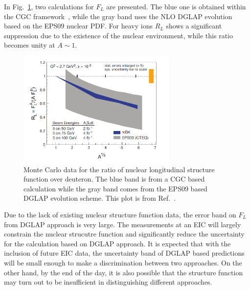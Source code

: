 In Fig.~\ref{fig:F_L}, two calculations for $F_L$ are presented. The blue one is
obtained within the CGC framework~\cite{Albacete:2009fh}, while the gray band uses the
NLO DGLAP evolution based on the EPS09 nuclear PDF. For heavy ions $R_L$ shows a
significant suppression due to the existence of the nuclear environment,
while this ratio becomes unity at $A\sim 1$. 
\begin{figure}
\centering
\includegraphics[width=0.7\textwidth]{plots/chpt3/FL_WP.png}
\caption[Longitudinal structure function ratio of different nuclear types over deuteron]{
Monte Carlo data for the ratio of nuclear longitudinal structure function over deuteron. The blue band is from a CGC based calculation while the gray band comes from the EPS09 based DGLAP evolution scheme. This plot is from Ref.~\cite{Accardi:2012qut}.}
\label{fig:F_L}
\end{figure}
Due to the lack of existing nuclear structure function data, the error band on $F_L$ from 
DGLAP approach is very large. The measurements at an EIC will largely constrain the nuclear strucutre
function and significantly reduce the uncertainty for the calculation based on DGLAP approach.
It is expected that with the inclusion of future EIC data, the uncertainty band of DGLAP based
predictions will be small enough to make a discrimination between two approaches.
On the other hand, by the end of the day, it is also possible that the structure function may turn out to be insufficient 
in distinguishing different approaches.


